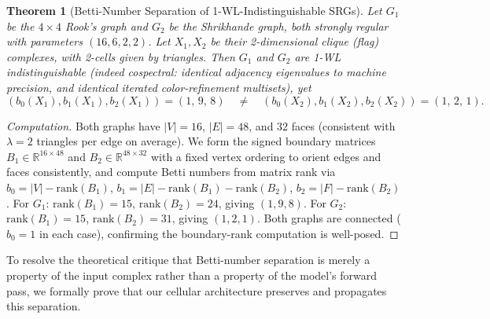 \documentclass[11pt, letterpaper]{article}
\newtheorem{theorem}{Theorem}[section]
\begin{document}
\begin{theorem}[Betti-Number Separation of 1-WL-Indistinguishable SRGs]
Let $G_1$ be the $4\times 4$ Rook's graph and $G_2$ be the Shrikhande graph, both strongly regular with parameters $(16,6,2,2)$. Let $X_1, X_2$ be their 2-dimensional clique (flag) complexes, with 2-cells given by triangles. Then $G_1$ and $G_2$ are 1-WL indistinguishable (indeed cospectral: identical adjacency eigenvalues to machine precision, and identical iterated color-refinement multisets), yet
\begin{equation}
    (b_0(X_1), b_1(X_1), b_2(X_1)) = (1,\,9,\,8) \quad \neq \quad (b_0(X_2), b_1(X_2), b_2(X_2)) = (1,\,2,\,1).
\end{equation}
\end{theorem}
\begin{proof}[Computation]
Both graphs have $|V|=16$, $|E|=48$, and $32$ faces (consistent with $\lambda=2$ triangles per edge on average). We form the signed boundary matrices $B_1 \in \mathbb{R}^{16\times 48}$ and $B_2 \in \mathbb{R}^{48\times 32}$ with a fixed vertex ordering to orient edges and faces consistently, and compute Betti numbers from matrix rank via $b_0 = |V| - \text{rank}(B_1)$, $b_1 = |E| - \text{rank}(B_1) - \text{rank}(B_2)$, $b_2 = |F| - \text{rank}(B_2)$. For $G_1$: $\text{rank}(B_1)=15$, $\text{rank}(B_2)=24$, giving $(1,9,8)$. For $G_2$: $\text{rank}(B_1)=15$, $\text{rank}(B_2)=31$, giving $(1,2,1)$. Both graphs are connected ($b_0=1$ in each case), confirming the boundary-rank computation is well-posed.
\end{proof}

To resolve the theoretical critique that Betti-number separation is merely a property of the input complex rather than a property of the model's forward pass, we formally prove that our cellular architecture preserves and propagates this separation.
\end{document}
